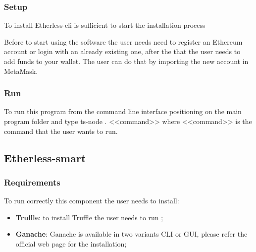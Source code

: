 \subsubsection{Setup}
To install Etherless-cli is sufficient to start the installation process

\begin{center}
\end{center} 
Before to start using the software the user needs need to register an Ethereum account or login with an already existing one, after the that the user needs to add funds to your wallet.
The user can do that by importing the new account in MetaMask.

\subsubsection{Run}
To run this program from the command line interface positioning on the main program folder
and type ts-node . <<command>> where <<command>> is the command that the user wants to run.
\subsection{Etherless-smart}
\subsubsection{Requirements}
To run correctly this component the user needs to install:
\begin{itemize}
    \item \textbf{Truffle}: to install Truffle the user needs to run ;
    \item \textbf{Ganache}: Ganache is available in two variants CLI or GUI, please refer the official web page for the installation;
\end{itemize}

